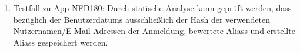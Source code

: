 \begin{enumerate}[label=\textbf{/T\arabic*0/}, align=left]
	\item Testfall zu App NFD180: Durch \gls{statische Analyse} kann geprüft werden, dass bezüglich der \Glspl{Benutzerdatum} ausschließlich der \Gls{Hash} der verwendeten Nutzernamen/E-Mail-Adressen der Anmeldung, bewertete \Glspl{Alias} und erstellte \Glspl{Alias} gespeichert werden.
\end{enumerate}